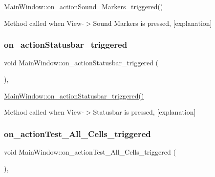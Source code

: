 \hyperlink{class_main_window_a4b49e5d0db6f503d31748bf48c3179e7}{Main\+Window\+::on\+\_\+action\+Sound\+\_\+\+Markers\+\_\+triggered()} 

Method called when View-\/$>$Sound Markers is pressed, \mbox{[}explanation\mbox{]} \mbox{\label{class_main_window_a37848047e4bc8594a3e83e75bd6383cf}} 
\subsubsection{\texorpdfstring{on\+\_\+action\+Statusbar\+\_\+triggered}{on\_actionStatusbar\_triggered}}
{\footnotesize\ttfamily void Main\+Window\+::on\+\_\+action\+Statusbar\+\_\+triggered (\begin{DoxyParamCaption}{ }\end{DoxyParamCaption})\hspace{0.3cm}{\ttfamily [private]}, {\ttfamily [slot]}}



\hyperlink{class_main_window_a37848047e4bc8594a3e83e75bd6383cf}{Main\+Window\+::on\+\_\+action\+Statusbar\+\_\+triggered()} 

Method called when View-\/$>$Statusbar is pressed, \mbox{[}explanation\mbox{]} \mbox{\label{class_main_window_a7ba69db7e0da3b95a98c3207deaabacb}} 
\subsubsection{\texorpdfstring{on\+\_\+action\+Test\+\_\+\+All\+\_\+\+Cells\+\_\+triggered}{on\_actionTest\_All\_Cells\_triggered}}
{\footnotesize\ttfamily void Main\+Window\+::on\+\_\+action\+Test\+\_\+\+All\+\_\+\+Cells\+\_\+triggered (\begin{DoxyParamCaption}{ }\end{DoxyParamCaption})\hspace{0.3cm}{\ttfamily [private]}, {\ttfamily [slot]}}



